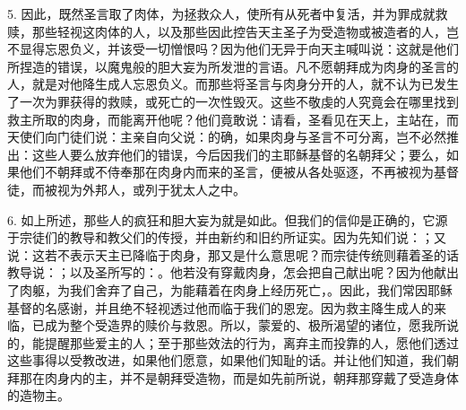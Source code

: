 5. 因此，既然圣言取了肉体，为拯救众人，使所有从死者中复活，并为罪成就救赎，那些轻视这肉体的人，以及那些因此控告天主圣子为受造物或被造者的人，岂不显得忘恩负义，并该受一切憎恨吗？因为他们无异于向天主喊叫说：这就是他们所捏造的错误，以魔鬼般的胆大妄为所发泄的言语。凡不愿朝拜成为肉身的圣言的人，就是对他降生成人忘恩负义。而那些将圣言与肉身分开的人，就不认为已发生了一次为罪获得的救赎，或死亡的一次性毁灭。这些不敬虔的人究竟会在哪里找到救主所取的肉身，而能离开他呢？他们竟敢说：请看，圣看见在天上，主站在，而天使们向门徒们说：主亲自向父说：的确，如果肉身与圣言不可分离，岂不必然推出：这些人要么放弃他们的错误，今后因我们的主耶稣基督的名朝拜父；要么，如果他们不朝拜或不侍奉那在肉身内而来的圣言，便被从各处驱逐，不再被视为基督徒，而被视为外邦人，或列于犹太人之中。\par

6. 如上所述，那些人的疯狂和胆大妄为就是如此。但我们的信仰是正确的，它源于宗徒们的教导和教父们的传授，并由新约和旧约所证实。因为先知们说：；又说：这若不表示天主已降临于肉身，那又是什么意思呢？而宗徒传统则藉着圣的话教导说：；以及圣所写的：。他若没有穿戴肉身，怎会把自己献出呢？因为他献出了肉躯，为我们舍弃了自己，为能藉着在肉身上经历死亡，。因此，我们常因耶稣基督的名感谢，并且绝不轻视透过他而临于我们的恩宠。因为救主降生成人的来临，已成为整个受造界的赎价与救恩。所以，蒙爱的、极所渴望的诸位，愿我所说的，能提醒那些爱主的人；至于那些效法的行为，离弃主而投靠的人，愿他们透过这些事得以受教改进，如果他们愿意，如果他们知耻的话。并让他们知道，我们朝拜那在肉身内的主，并不是朝拜受造物，而是如先前所说，朝拜那穿戴了受造身体的造物主。\par

